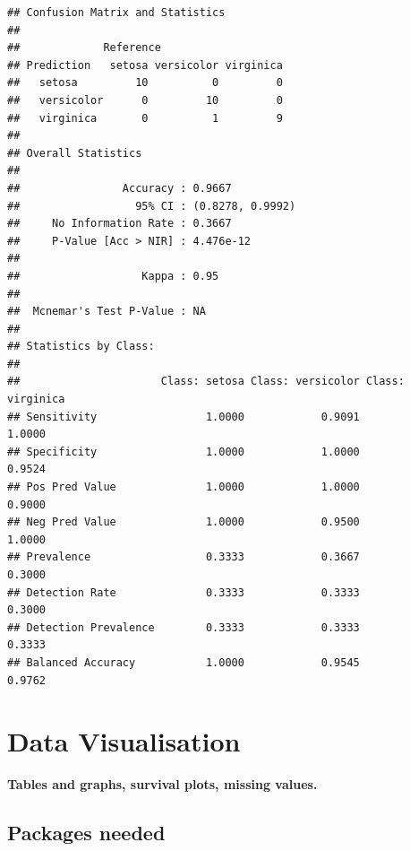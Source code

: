 \documentclass[
]{article}
\begin{document}
\begin{verbatim}
## Confusion Matrix and Statistics
## 
##             Reference
## Prediction   setosa versicolor virginica
##   setosa         10          0         0
##   versicolor      0         10         0
##   virginica       0          1         9
## 
## Overall Statistics
##                                           
##                Accuracy : 0.9667          
##                  95% CI : (0.8278, 0.9992)
##     No Information Rate : 0.3667          
##     P-Value [Acc > NIR] : 4.476e-12       
##                                           
##                   Kappa : 0.95            
##                                           
##  Mcnemar's Test P-Value : NA              
## 
## Statistics by Class:
## 
##                      Class: setosa Class: versicolor Class: virginica
## Sensitivity                 1.0000            0.9091           1.0000
## Specificity                 1.0000            1.0000           0.9524
## Pos Pred Value              1.0000            1.0000           0.9000
## Neg Pred Value              1.0000            0.9500           1.0000
## Prevalence                  0.3333            0.3667           0.3000
## Detection Rate              0.3333            0.3333           0.3000
## Detection Prevalence        0.3333            0.3333           0.3333
## Balanced Accuracy           1.0000            0.9545           0.9762
\end{verbatim}

\hypertarget{data-visualisation}{%
\section{Data Visualisation}\label{data-visualisation}}

\textbf{Tables and graphs, survival plots, missing values.}

\hypertarget{packages-needed}{%
\subsection{Packages needed}\label{packages-needed}}
\end{document}
